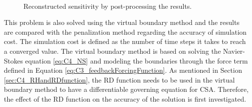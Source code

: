 \begin{figure}[H]
    \centering
    \quad
    \\
    \quad
    \caption{Reconstructed sensitivity by post-processing the results.}
    \label{fig:C4_sensitivityResultsReconstructed1Dproblem}
\end{figure}
%
This problem is also solved using the virtual boundary method and the results are compared with the penalization method regarding the accuracy of simulation cost. The simulation cost is defined as the number of time steps it takes to reach a converged value. The virtual boundary method is based on solving the Navier-Stokes equation \eqref{eq:C4_NS} and modeling the boundaries through the force term defined in Equation \eqref{eq:C3_feedbackForcingFunction}. As mentioned in Section \ref{sec:C4_RHandRDfunction}, the RD function needs to be used in the virtual boundary method to have a differentiable governing equation for CSA. Therefore, the effect of the RD function on the accuracy of the solution is first investigated.

